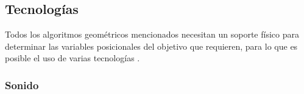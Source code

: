 




\subsection{Tecnologías}

Todos los algoritmos geométricos mencionados necesitan un soporte físico para determinar las variables posicionales del objetivo que requieren, para lo que es posible el uso de varias tecnologías \cite{COMP}.

\subsubsection{Sonido}

